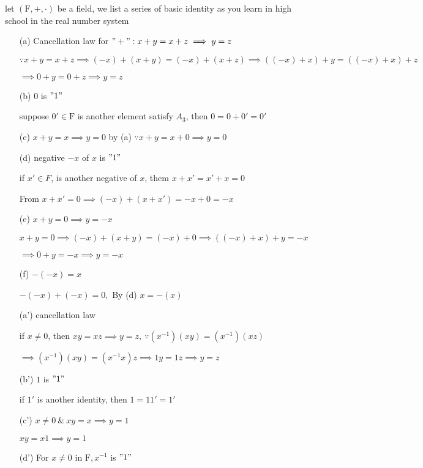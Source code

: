 \newpage

let $(\mathrm{F},+,\cdot)$ be a field, we list a series of basic identity as you learn in high school in the real number system

\begin{enumerate}
	\item[(a)] Cancellation law for $"+":x+y = x+z \implies y = z$
	
	$\because x+y = x+z \implies (-x)+(x+y)=(-x)+(x+z) \implies ((-x)+x)+y = ((-x)+x)+z$
	
	$\implies 0+y = 0+z \implies y=z$
	
	\item[(b)] $0$ is $"1"$
	
	suppose $0' \in \mathrm{F}$ is another element satisfy $A_3$, then $0 = 0+0'=0'$
	\item[(c)] $x+y = x \implies y = 0$ by (a) $\because x+y = x+0 \implies y=0$
	
	\item[(d)] negative $-x$ of $x$ is $"1"$
	
	if $x' \in F$, is another negative of $x$, them $x+x' = x'+x = 0$
	
	From $x + x' = 0 \implies (-x)+(x + x')=-x+0=-x$
	
	\item[(e)] $x+y = 0 \implies y = -x$
	
	$x +y=0 \implies (-x)+(x+y) = (-x)+0 \implies ((-x)+x)+y = -x $
	
	$\implies 0+y = -x \implies y = -x$
	
	\item[(f)] $-(-x) = x $
	
	$-(-x)+(-x) = 0,$ By (d) $x = -(x)$
	
	\item[(a')]cancellation law
	
	if $x \neq 0$, then $xy = xz \implies y = z,~\because (x^{-1})(xy) = (x^{-1})(xz)$
	
	$\implies (x^{-1})(xy) = (x^{-1}x)z \implies 1y = 1z \implies y = z$
	\item[(b')]$1$ is $"1"$
	
	if $1'$ is another identity, then $1 = 11' = 1'$
	
	\item[(c')] $x \neq 0 ~\&~ xy = x \implies y = 1$
	
	$xy = x1 \implies y = 1$
	
	\item[(d')]For $x \neq 0$ in $\mathrm{F}, x^{-1}$ is $"1"$
	

\end{enumerate}
